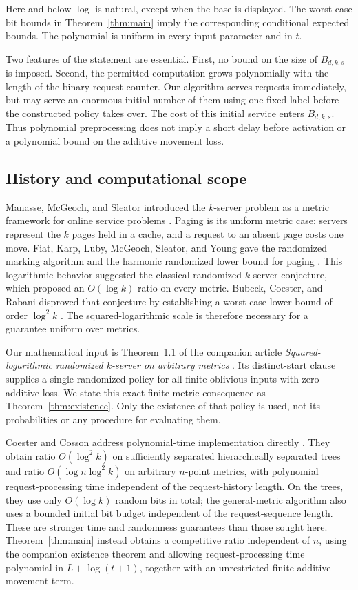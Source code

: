 Here and below \(\log\) is natural, except when the base is displayed.
The worst-case bit bounds in Theorem~\ref{thm:main} imply the corresponding
conditional expected bounds. The polynomial is uniform in every input
parameter and in \(t\).

Two features of the statement are essential. First, no bound on the size of
\(B_{d,k,s}\) is imposed. Second, the permitted computation grows polynomially
with the length of the binary request counter. Our algorithm serves
requests immediately, but may serve an enormous initial number of them
using one fixed label before the constructed policy takes over. The cost
of this initial service enters \(B_{d,k,s}\). Thus polynomial preprocessing
does not imply a short delay before activation or a polynomial bound on
the additive movement loss.

\subsection{History and computational scope}

Manasse, McGeoch, and Sleator introduced the \(k\)-server problem as a metric
framework for online service problems \cite{MMS1990}. Paging is its uniform
metric case: servers represent the \(k\) pages held in a cache, and a request
to an absent page costs one move. Fiat, Karp, Luby, McGeoch, Sleator, and
Young gave the randomized marking algorithm and the harmonic randomized
lower bound for paging \cite{FKLMSY1991}. This logarithmic behavior suggested
the classical randomized \(k\)-server conjecture, which proposed an
\(O(\log k)\) ratio on every metric. Bubeck, Coester, and Rabani disproved
that conjecture by establishing a worst-case lower bound of order
\(\log^2 k\) \cite{BCR2023}. The squared-logarithmic scale is therefore
necessary for a guarantee uniform over metrics.

Our mathematical input is Theorem~1.1 of the companion article
\emph{Squared-logarithmic randomized \(k\)-server on arbitrary metrics}
\cite{SquaredLog2026}. Its distinct-start clause supplies a single randomized
policy for all finite oblivious inputs with zero additive loss. We state
this exact finite-metric consequence as Theorem~\ref{thm:existence}.
Only the existence of that policy is used, not its probabilities or any
procedure for evaluating them.

Coester and Cosson address polynomial-time implementation directly
\cite[Theorem~1 and Corollary~2]{CoesterCosson2026}. They obtain ratio
\(O(\log^2 k)\) on sufficiently separated hierarchically separated trees
and ratio \(O(\log n\log^2 k)\) on arbitrary \(n\)-point metrics, with
polynomial request-processing time independent of the request-history
length. On the trees, they use only \(O(\log k)\) random bits in total;
the general-metric algorithm also uses a bounded initial bit budget
independent of the request-sequence length. These are stronger
time and randomness guarantees than those sought here. Theorem~\ref{thm:main}
instead obtains a competitive ratio independent of \(n\), using the
companion existence theorem and allowing request-processing time polynomial
in \(L+\log(t+1)\), together with an unrestricted finite additive movement
term.

